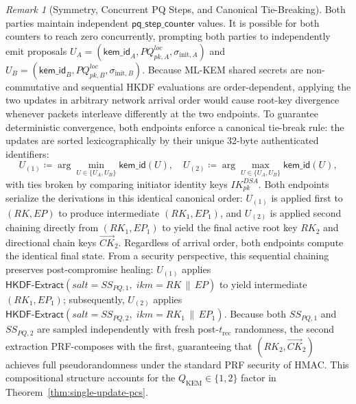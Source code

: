 \documentclass[11pt,a4paper]{article}
\theoremstyle{remark}
\newtheorem{remark}[theorem]{Remark}
\theoremstyle{plain}
\newcommand{\HKDFExtract}{\mathsf{HKDF\text{-}Extract}}
\begin{document}
\begin{remark}[Symmetry, Concurrent PQ Steps, and Canonical Tie-Breaking]
\label{rem:concurrent}
Both parties maintain independent $\mathsf{pq\_step\_counter}$ values.  It is possible for
both counters to reach zero concurrently, prompting both parties to independently emit proposals
$U_A = (\mathsf{kem\_id}_A, PQ^{loc}_{pk,A}, \sigma_{\mathrm{init},A})$ and
$U_B = (\mathsf{kem\_id}_B, PQ^{loc}_{pk,B}, \sigma_{\mathrm{init},B})$.
Because ML-KEM shared secrets are non-commutative and sequential HKDF evaluations are order-dependent,
applying the two updates in arbitrary network arrival order would cause root-key divergence whenever
packets interleave differently at the two endpoints.
To guarantee deterministic convergence, both endpoints enforce a canonical tie-break rule:
the updates are sorted lexicographically by their unique 32-byte authenticated identifiers:
\[
  U_{(1)} \coloneqq \arg\min_{U \in \{U_A, U_B\}} \mathsf{kem\_id}(U), \quad
  U_{(2)} \coloneqq \arg\max_{U \in \{U_A, U_B\}} \mathsf{kem\_id}(U),
\]
with ties broken by comparing initiator identity keys $IK^{DSA}_{pk}$.
Both endpoints serialize the derivations in this identical canonical order: $U_{(1)}$ is applied first
to $(RK, EP)$ to produce intermediate $(RK_1, EP_1)$, and $U_{(2)}$ is applied second chaining directly
from $(RK_1, EP_1)$ to yield the final active root key $RK_2$ and directional chain keys $\vec{CK}_2$.
Regardless of arrival order, both endpoints compute the identical final state.
From a security perspective, this sequential chaining preserves post-compromise healing:
$U_{(1)}$ applies $\HKDFExtract(salt = SS_{PQ,1},\; ikm = RK \,\|\, EP)$ to yield intermediate $(RK_1, EP_1)$;
subsequently, $U_{(2)}$ applies $\HKDFExtract(salt = SS_{PQ,2},\; ikm = RK_1 \,\|\, EP_1)$.
Because both $SS_{PQ,1}$ and $SS_{PQ,2}$ are sampled independently with fresh post-$t_{\mathrm{rec}}$ randomness,
the second extraction PRF-composes with the first, guaranteeing that $(RK_2, \vec{CK}_2)$ achieves full pseudorandomness
under the standard PRF security of HMAC.  This compositional structure accounts for the $Q_{\mathrm{KEM}} \in \{1, 2\}$
factor in Theorem~\ref{thm:single-update-pcs}.
\end{remark}
\end{document}
